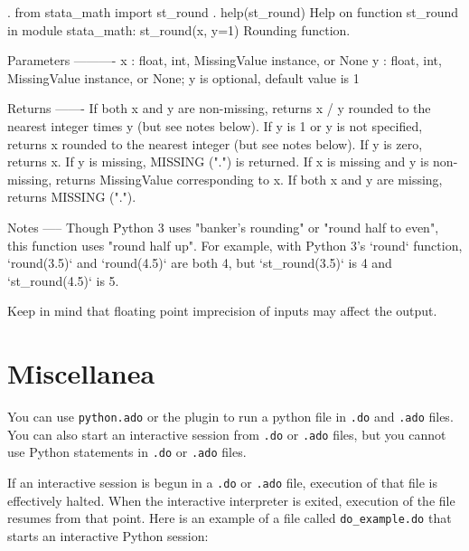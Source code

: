 \documentclass{article}
\begin{document}
\begin{stlog}
{\smallskip}
{\bftt{>>>}}. from stata_math import st_round
{\smallskip}
{\bftt{>>>}}. help(st_round)
Help on function st_round in module stata_math:
{\smallskip}
st_round(x, y=1)
    Rounding function.
    
    Parameters
    ----------
    x : float, int, MissingValue instance, or None
    y : float, int, MissingValue instance, or None;
        y is optional, default value is 1
    
    Returns
    -------
    If both x and y are non-missing, returns x / y rounded to
        the nearest integer times y (but see notes below).
    If y is 1 or y is not specified, returns x rounded to the 
        nearest integer (but see notes below).
    If y is zero, returns x.
    If y is missing, MISSING (".") is returned.
    If x is missing and y is non-missing, returns MissingValue
        corresponding to x.
    If both x and y are missing, returns MISSING (".").
    
    Notes
    -----
    Though Python 3 uses "banker's rounding" or "round half to even",
    this function uses "round half up". For example, with Python 3's
    `round` function, `round(3.5)` and `round(4.5)` are both 4, but
    `st_round(3.5)` is 4 and `st_round(4.5)` is 5.
    
    Keep in mind that floating point imprecision of inputs may affect
    the output.
{\smallskip}
{\smallskip}
\end{stlog}



\section{Miscellanea} \label{misc}
		
You can use \lstinline$python.ado$ or the plugin to run a python file in \lstinline$.do$ and \lstinline$.ado$ files. You can also start an interactive session from \lstinline$.do$ or \lstinline{.ado} files, but you cannot use Python statements in \lstinline$.do$ or \lstinline$.ado$ files.
		
If an interactive session is begun in a \lstinline{.do} or \lstinline{.ado} file, execution of that file is effectively halted. When the interactive interpreter is exited, execution of the file resumes from that point. Here is an example of a file called \lstinline$do_example.do$ that starts an interactive Python session: \newline
\end{document}
